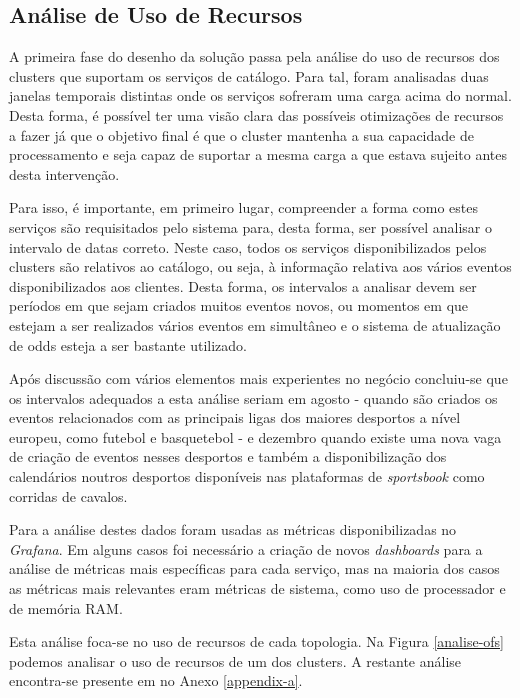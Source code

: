 \subsection{Análise de Uso de Recursos}

A primeira fase do desenho da solução passa pela análise do uso de recursos dos \glspl{cluster}
que suportam os serviços de catálogo. Para tal, foram analisadas duas janelas temporais distintas
onde os serviços sofreram uma carga acima do normal. Desta forma, é possível ter uma visão clara
das possíveis otimizações de recursos a fazer já que o objetivo final é que o \gls{cluster}
mantenha a sua capacidade de processamento e seja capaz de suportar a mesma carga a que estava
sujeito antes desta intervenção.

Para isso, é importante, em primeiro lugar, compreender a forma como estes serviços são requisitados
pelo sistema para, desta forma, ser possível analisar o intervalo de datas correto. Neste caso,
todos os serviços disponibilizados pelos \glspl{cluster} são relativos ao catálogo, ou seja,
à informação relativa aos vários eventos disponibilizados aos clientes. Desta forma, os intervalos
a analisar devem ser períodos em que sejam criados muitos eventos novos, ou momentos em que
estejam a ser realizados vários eventos em simultâneo e o sistema de atualização de \glspl{odd}
esteja a ser bastante utilizado.

Após discussão com vários elementos mais experientes no negócio concluiu-se que os intervalos
adequados a esta análise seriam em agosto - quando são criados os eventos relacionados com as
principais ligas dos maiores desportos a nível europeu, como futebol e basquetebol - e dezembro 
quando existe uma nova vaga de criação de eventos nesses desportos e também a disponibilização 
dos calendários noutros desportos disponíveis nas plataformas de \textit{sportsbook} como
corridas de cavalos.

Para a análise destes dados foram usadas as métricas disponibilizadas no \textit{Grafana}. Em alguns
casos foi necessário a criação de novos \textit{dashboards} para a análise de métricas mais 
específicas para cada serviço, mas na maioria dos casos as métricas mais relevantes eram métricas 
de sistema, como uso de processador e de memória RAM.

Esta análise foca-se no uso de recursos de cada topologia. Na Figura \ref{analise-ofs} podemos
analisar o uso de recursos de um dos \glspl{cluster}. A restante análise encontra-se
presente em no Anexo \ref{appendix-a}.

